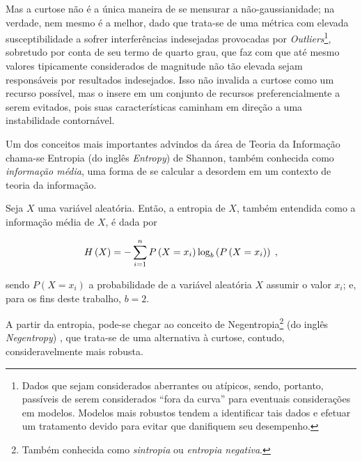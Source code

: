 Mas a curtose não é a única maneira de se mensurar a não-gaussianidade; na verdade, nem mesmo é a melhor, dado que trata-se de uma métrica com elevada susceptibilidade a sofrer interferências indesejadas provocadas por \textit{Outliers}\footnote{Dados que sejam considerados aberrantes ou atípicos, sendo, portanto, passíveis de serem considerados ``fora da curva'' para eventuais considerações em modelos. Modelos mais robustos tendem a identificar tais dados e efetuar um tratamento devido para evitar que danifiquem seu desempenho.}, sobretudo por conta de seu termo de quarto grau, que faz com que até mesmo valores tipicamente considerados de magnitude não tão elevada sejam responsáveis por resultados indesejados. Isso não invalida a curtose como um recurso possível, mas o insere em um conjunto de recursos preferencialmente a serem evitados, pois suas características caminham em direção a uma instabilidade contornável.

Um dos conceitos mais importantes advindos da área de Teoria da Informação chama-se Entropia (do inglês \textit{Entropy}) de Shannon, também conhecida como \textit{informação média}, uma forma de se calcular a desordem em um contexto de teoria da informação.\\

\begin{definition}[Entropia]
    Seja $X$ uma variável aleatória. Então, a entropia de $X$, também entendida como a informação média de $X$, é dada por

    \begin{equation}
        H\left(X\right) = - \sum_{i=1}^{n}P\left(X=x_{i}\right) \log_{b} \left(P\left(X=x_{i}\right)\right)
        \hspace{0.1cm},
        \vspace{0.2cm}
        \label{eq:bss_entropy}
    \end{equation}

    \noindent sendo $P(X=x_{i})$ a probabilidade de a variável aleatória $X$ assumir o valor $x_{i}$; e, para os fins deste trabalho, $b=2$.

\end{definition}

A partir da entropia, pode-se chegar ao conceito de Negentropia\footnote{Também conhecida como \textit{sintropia} ou \textit{entropia negativa}.} (do inglês \textit{Negentropy}) \citep{schrodinger1944life, brillouin1953negentropy, mahulikar2009exact}, que trata-se de uma alternativa à curtose, contudo, consideravelmente mais robusta.\\


